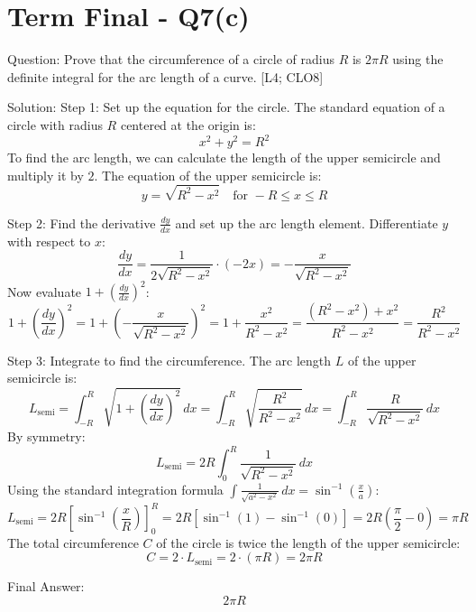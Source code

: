 \documentclass[11pt, a4paper]{article}
\begin{document}
\section*{Term Final - Q7(c)}

Question:
Prove that the circumference of a circle of radius $R$ is $2\pi R$ using the definite integral for the arc length of a curve. [L4; CLO8]

Solution:
Step 1: Set up the equation for the circle.
The standard equation of a circle with radius $R$ centered at the origin is:
\[
x^2 + y^2 = R^2
\]
To find the arc length, we can calculate the length of the upper semicircle and multiply it by $2$.
The equation of the upper semicircle is:
\[
y = \sqrt{R^2 - x^2} \quad \text{for } -R \le x \le R
\]

Step 2: Find the derivative $\frac{dy}{dx}$ and set up the arc length element.
Differentiate $y$ with respect to $x$:
\[
\frac{dy}{dx} = \frac{1}{2\sqrt{R^2 - x^2}} \cdot (-2x) = -\frac{x}{\sqrt{R^2 - x^2}}
\]
Now evaluate $1 + \left(\frac{dy}{dx}\right)^2$:
\[
1 + \left(\frac{dy}{dx}\right)^2 = 1 + \left( -\frac{x}{\sqrt{R^2 - x^2}} \right)^2 = 1 + \frac{x^2}{R^2 - x^2} = \frac{(R^2 - x^2) + x^2}{R^2 - x^2} = \frac{R^2}{R^2 - x^2}
\]

Step 3: Integrate to find the circumference.
The arc length $L$ of the upper semicircle is:
\[
L_{\text{semi}} = \int_{-R}^{R} \sqrt{1 + \left(\frac{dy}{dx}\right)^2} \, dx = \int_{-R}^{R} \sqrt{\frac{R^2}{R^2 - x^2}} \, dx = \int_{-R}^{R} \frac{R}{\sqrt{R^2 - x^2}} \, dx
\]
By symmetry:
\[
L_{\text{semi}} = 2R \int_{0}^{R} \frac{1}{\sqrt{R^2 - x^2}} \, dx
\]
Using the standard integration formula $\int \frac{1}{\sqrt{a^2 - x^2}} \, dx = \sin^{-1}(\frac{x}{a})$:
\[
L_{\text{semi}} = 2R \left[ \sin^{-1}\left(\frac{x}{R}\right) \right]_{0}^{R} = 2R \left[ \sin^{-1}(1) - \sin^{-1}(0) \right] = 2R \left( \frac{\pi}{2} - 0 \right) = \pi R
\]
The total circumference $C$ of the circle is twice the length of the upper semicircle:
\[
C = 2 \cdot L_{\text{semi}} = 2 \cdot (\pi R) = 2\pi R
\]

Final Answer:
\[
\boxed{2\pi R}
\]



\end{document}
